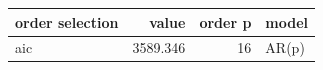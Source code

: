 \begin{tabular}{lrrl}
\toprule
order selection & value & order p & model \\
\midrule
aic & 3589.346 & 16 & AR(p) \\
\bottomrule
\end{tabular}
